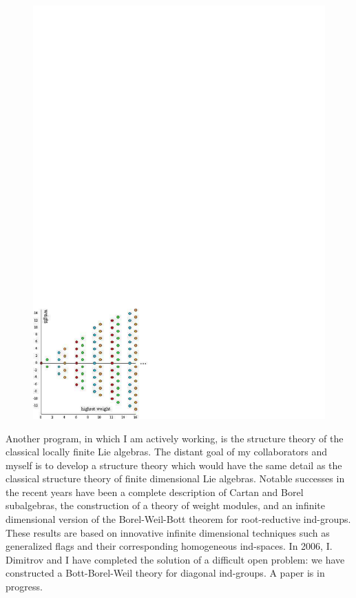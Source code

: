 \begin{figure}[ht]
  \begin{center}
    \includegraphics[width=\hsize]{Penkov/profPenkov_2006_fig1}
    \label{fig:profPenkov}
   \end{center}
\end{figure}

Another program, in which I am actively working, is the structure
theory of the classical locally finite Lie algebras. The distant goal
of my collaborators and myself is to develop a structure theory which
would have the same detail as the classical structure theory of finite
dimensional Lie algebras. Notable successes in the recent years have
been a complete description of Cartan and Borel subalgebras, the
construction of a theory of weight modules, and an infinite
dimensional version of the Borel-Weil-Bott theorem for root-reductive
ind-groups. These results are based on innovative infinite dimensional
techniques such as generalized flags and their corresponding
homogeneous ind-spaces. In 2006, I. Dimitrov and I have completed the
solution of a difficult open problem: we have constructed a
Bott-Borel-Weil theory for diagonal ind-groups. A paper is in
progress.

